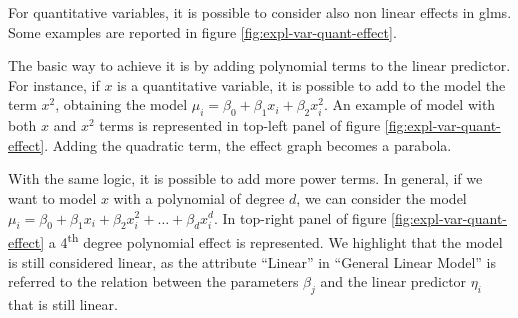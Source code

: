 \documentclass[a4paper, twoside, openright, 12pt]{report}
\let\origfigure\figure
\let\endorigfigure\endfigure
\renewenvironment{figure}[1][2] {
  \expandafter\origfigure\expandafter[!hbtp]
} {
  \endorigfigure
}
\theoremstyle{definition}
\theoremstyle{definition}
\theoremstyle{definition}
\theoremstyle{remark}
\begin{document}
For quantitative variables, it is possible to consider also non linear effects in \ac{glm}s. Some examples are reported in figure \ref{fig:expl-var-quant-effect}.





\begin{figure}[!hbtp]

{\centering {}\newline{}

}

\caption{Explanatory quantitative variables effects.}\label{fig:expl-var-quant-effect}
\end{figure}

The basic way to achieve it is by adding polynomial terms to the linear predictor. For instance, if \(x\) is a quantitative variable, it is possible to add to the model the term \(x^2\), obtaining the model \(\mu_i = \beta_0 + \beta_1 x_{i} + \beta_2 x_i^2\). An example of model with both \(x\) and \(x^2\) terms is represented in top-left panel of figure \ref{fig:expl-var-quant-effect}. Adding the quadratic term, the effect graph becomes a parabola.

With the same logic, it is possible to add more power terms. In general, if we want to model \(x\) with a polynomial of degree \(d\), we can consider the model \(\mu_i = \beta_0 + \beta_1 x_{i} + \beta_2 x_{i}^2 + \dots + \beta_d x_{i}^d\). In top-right panel of figure \ref{fig:expl-var-quant-effect} a 4\textsuperscript{th} degree polynomial effect is represented. We highlight that the model is still considered linear, as the attribute ``Linear'' in ``General Linear Model'' is referred to the relation between the parameters \(\beta_j\) and the linear predictor \(\eta_i\) that is still linear.
\end{document}
